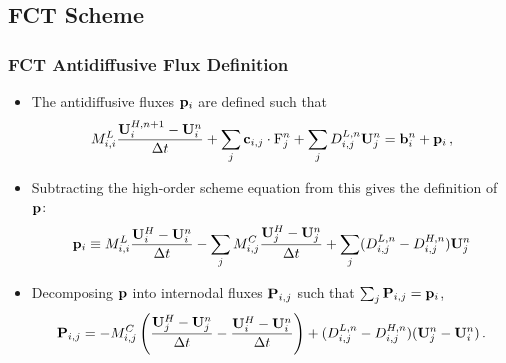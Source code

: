 \documentclass{beamer} \useoutertheme{infolines}
\begin{document}
\subsection{FCT Scheme}
\begin{frame}
\frametitle{FCT Antidiffusive Flux Definition}

\begin{itemize}
  \item The antidiffusive fluxes $\mathbf{p}_i$ are defined such that
    \begin{equation}
      \lumpedmassentry
        \frac{\solutionvector_i^{H,n+1}-\solutionvector_i^n}{\dt}
        + \sum_j\gradiententry\cdot\consfluxinterpolant_j^n
        + \sum_j\diffusionmatrixletter\ij^{L,n}\solutionvector_j^n
        = \ssrhs_i^n + \correctionfluxvector_i\eqc
    \end{equation}
   \item Subtracting the high-order scheme equation from this gives the
      definition of $\mathbf{p}$:
      \begin{equation}
        \mathbf{p}_i \equiv
          M^L_{i,i}
            \frac{\mathbf{U}_i^{H}-\mathbf{U}_i^n}{\Delta t}
          -\sum_jM^C_{i,j}
            \frac{\mathbf{U}_j^{H}-\mathbf{U}_j^n}{\Delta t}
          +\sum_j(D_{i,j}^{L,n}-D_{i,j}^{H,n})
            \mathbf{U}_j^n
      \end{equation}
   \item Decomposing $\mathbf{p}$ into internodal fluxes
      $\correctionfluxmatrix\ij$ such that $\sum_j \correctionfluxmatrix\ij =
      \correctionfluxvector_i$,
      \begin{equation}
        \correctionfluxmatrix\ij = -M\ij^C\pr{
            \frac{\solutionvector_j^{H}-\solutionvector_j^n}{\dt}
            -\frac{\solutionvector_i^{H}-\solutionvector_i^n}{\dt}
          }
          + (D\ij^{L,n}-D\ij^{H,n})(\solutionvector_j^n-\solutionvector_i^n) \eqp
      \end{equation}
\end{itemize}

\end{frame}
\end{document}
